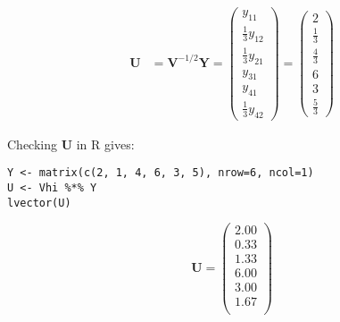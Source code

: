 \documentclass[11pt]{article}
\begin{document}
\begin{align*}
\mathbf{U} &= \mathbf{V}^{-1/2} \mathbf{Y} = 
\begin{pmatrix}
y_{11} \\ \frac{1}{3} y_{12}\\ \frac{1}{3} y_{21}\\ y_{31}\\ y_{41}\\ \frac{1}{3}y_{42}
\end{pmatrix} = 
\begin{pmatrix} 
2\\ \frac{1}{3}\\ \frac{4}{3}\\ 6\\ 3\\ \frac{5}{3}
\end{pmatrix}
\end{align*}

Checking \textbf{U} in R gives:

\begin{verbatim}
Y <- matrix(c(2, 1, 4, 6, 3, 5), nrow=6, ncol=1)
U <- Vhi %*% Y
lvector(U)
\end{verbatim}

\[
\mathbf{U} =
\begin{pmatrix}{}
  2.00 \\ 
  0.33 \\ 
  1.33 \\ 
  6.00 \\ 
  3.00 \\ 
  1.67 \\ 
  \end{pmatrix}
\]
\end{document}
